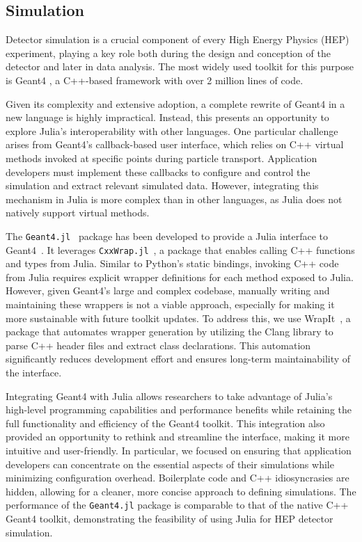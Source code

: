 \documentclass{webofc}
\begin{document}
\subsection{Simulation}
\label{sec:simulation}

Detector simulation is a crucial component of every High Energy Physics (HEP)
experiment, playing a key role both during the design and conception of the
detector and later in data analysis. The most widely used toolkit for this
purpose is Geant4 \cite{GEANT4:2002zbu}, a C++-based framework with over 2
million lines of code.

Given its complexity and extensive adoption, a complete rewrite of Geant4 in a
new language is highly impractical. Instead, this presents an opportunity to
explore Julia's interoperability with other languages. One particular challenge
arises from Geant4's callback-based user interface, which relies on C++ virtual
methods invoked at specific points during particle transport. Application
developers must implement these callbacks to configure and control the
simulation and extract relevant simulated data. However, integrating this
mechanism in Julia is more complex than in other languages, as Julia does not
natively support virtual methods.

The \texttt{Geant4.jl}~\cite{geant4-jl-github} package has been developed to
provide a Julia interface to Geant4~\cite{ALLISON2016186}. It leverages
\texttt{CxxWrap.jl}~\cite{CxxWrap.jl}, a package that enables calling C++
functions and types from Julia. Similar to Python's static bindings, invoking
C++ code from Julia requires explicit wrapper definitions for each method
exposed to Julia. However, given Geant4's large and complex codebase, manually
writing and maintaining these wrappers is not a viable approach, especially for
making it more sustainable with future toolkit updates. To address this, we use
WrapIt~\cite{wrapit-github}, a package that automates wrapper generation by
utilizing the Clang library to parse C++ header files and extract class
declarations. This automation significantly reduces development effort and
ensures long-term maintainability of the interface.

Integrating Geant4 with Julia allows researchers to take advantage of Julia's
high-level programming capabilities and performance benefits while retaining the
full functionality and efficiency of the Geant4 toolkit. This integration also
provided an opportunity to rethink and streamline the interface, making it more
intuitive and user-friendly. In particular, we focused on ensuring that
application developers can concentrate on the essential aspects of their
simulations while minimizing configuration overhead. Boilerplate code and C++
idiosyncrasies are hidden, allowing for a cleaner, more concise approach to
defining simulations. The performance of the \texttt{Geant4.jl} package is
comparable to that of the native C++ Geant4 toolkit, demonstrating the
feasibility of using Julia for HEP detector simulation.
\end{document}
